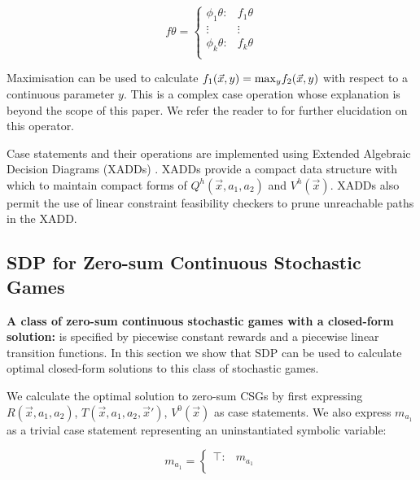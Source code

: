 \vspace{-1.5mm}
{\small 
\abovedisplayshortskip=0pt
\belowdisplayshortskip=0pt
\begin{equation*}
  f\theta = 
    \begin{cases}
      \phi_1\theta: & f_1\theta \\ 
      \vdots & \vdots\\ 
      \phi_k\theta: & f_k\theta \\ 
    \end{cases} \nonumber
\end{equation*}
}%

Maximisation can be used to calculate $f_1(\vec{x}, y) = \mathrm{max}_{y}f_2(\vec{x}, y) $
with respect to a continuous parameter $y$. This is a complex case operation
whose explanation is beyond the scope of this paper. We refer the reader to 
\cite{Zamani_AAAI_2012} for further elucidation on this operator.

Case statements and their operations are implemented using Extended 
Algebraic Decision Diagrams (XADDs) \cite{Sanner_UAI_2011}.
XADDs provide a compact data structure with which to maintain
compact forms of $Q^{h}(\vec{x}, a_1, a_2)$ and $V^{h}(\vec{x})$. 
XADDs also permit the use of linear constraint feasibility checkers to 
prune unreachable paths in the XADD.

\subsection{SDP for Zero-sum Continuous Stochastic Games}

{\bf A class of zero-sum continuous stochastic games with a closed-form solution:} is specified
by piecewise constant rewards and a piecewise linear transition functions. In this 
section we show that SDP can be used to calculate optimal closed-form
solutions to this class of stochastic games.

We calculate the optimal solution to zero-sum CSGs by first
expressing $R(\vec{x}, a_1, a_2)$, $T(\vec{x}, a_1, a_2, \vec{x}')$, 
$V^0(\vec{x})$ as case statements. We also express $m_{a_{1}}$
as a trivial case statement representing an uninstantiated symbolic variable:

{\small 
\abovedisplayshortskip=-5pt
\belowdisplayshortskip=0pt
\begin{equation*}
  m_{a_{1}} = 
    \begin{cases}
      \top: & m_{a_{1}} \\ 
    \end{cases} \nonumber
\end{equation*}
}%

